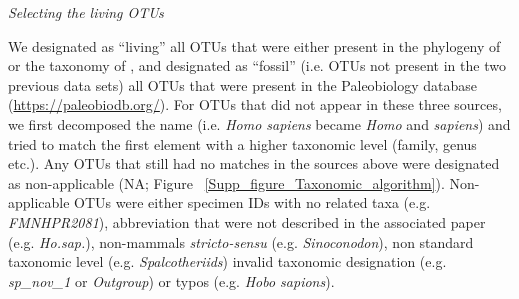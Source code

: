 \documentclass[12pt,letterpaper]{article}
\renewcommand{\subsection}[1]{%
\bigskip
\begin{center}
\begin{large}
\normalfont\itshape #1
\end{large}
\end{center}}
\begin{document}
\subsection{Selecting the living OTUs}
We designated as ``living'' all OTUs that were either present in the phylogeny of \cite{bininda-emondsthe2007} or the taxonomy of \cite{wilson2005mammal}, and designated as ``fossil'' (i.e. OTUs not present in the two previous data sets) all OTUs that were present in the Paleobiology database (\url{https://paleobiodb.org/}).
For OTUs that did not appear in these three sources, we first decomposed the name (i.e. \textit{Homo sapiens} became \textit{Homo} and \textit{sapiens}) and tried to match the first element with a higher taxonomic level (family, genus etc.).
Any OTUs that still had no matches in the sources above were designated as non-applicable (NA; Figure ~\ref{Supp_figure_Taxonomic_algorithm}).
Non-applicable OTUs were either specimen IDs with no related taxa (e.g. \textit{FMNHPR2081}), abbreviation that were not described in the associated paper (e.g. \textit{Ho.sap.}), non-mammals \textit{stricto-sensu} (e.g. \textit{Sinoconodon}), non standard taxonomic level (e.g. \textit{Spalcotheriids}) invalid taxonomic designation (e.g. \textit{sp\_nov\_1} or \textit{Outgroup}) or typos (e.g. \textit{Hobo sapions}).
\end{document}
